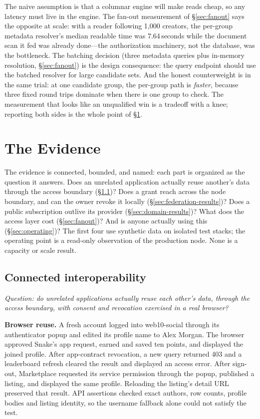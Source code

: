 \documentclass[sigconf, nonacm]{acmart}
\begin{document}
The naive assumption is that a columnar engine will make reads cheap, so any
latency must live in the engine. The fan-out measurement of
\S\ref{sec:fanout} says the opposite at scale: with a reader following
1,000 creators, the per-group metadata resolver's median readable time was
7.64\,seconds while the document scan it fed was already done---the
authorization machinery, not the database, was the bottleneck. The batching
decision (three metadata queries plus in-memory resolution,
\S\ref{sec:fanout}) is the design consequence: the query endpoint should use
the batched resolver for large candidate sets. And the honest counterweight
is in the same trial: at one candidate group, the per-group path is
\emph{faster}, because three fixed round trips dominate when there is one
group to check. The measurement that looks like an unqualified win is a
tradeoff with a knee; reporting both sides is the whole point of
\S\ref{sec:evidence}.

\section{The Evidence}
\label{sec:evidence}

The evidence is connected, bounded, and named: each part is organized as the
question it answers. Does an unrelated application actually reuse another's
data through the access boundary (\S\ref{sec:interop-results})? Does a grant
reach across the node boundary, and can the owner revoke it locally
(\S\ref{sec:federation-results})? Does a public subscription outlive its
provider (\S\ref{sec:domain-results})? What does the access layer cost
(\S\ref{sec:fanout})? And is anyone actually using this
(\S\ref{sec:operating})? The first four use synthetic data on isolated test
stacks; the operating point is a read-only observation of the production
node. None is a capacity or scale result.

\subsection{Connected interoperability}
\label{sec:interop-results}

\emph{Question: do unrelated applications actually reuse each other's data,
through the access boundary, with consent and revocation exercised in a real
browser?}

\textbf{Browser reuse.} A fresh account logged into web10-social through its
authenticator popup and edited its profile name to Alex Morgan. The browser
approved Snake's app request, earned and saved ten points, and displayed the
joined profile. After app-contract revocation, a new query returned 403 and
a leaderboard refresh cleared the result and displayed an access error. After
sign-out, Marketplace requested its service permission through the popup,
published a listing, and displayed the same profile. Reloading the listing's
detail URL preserved that result. API assertions checked exact authors, row
counts, profile bodies and listing identity, so the username fallback alone
could not satisfy the test.
\end{document}
